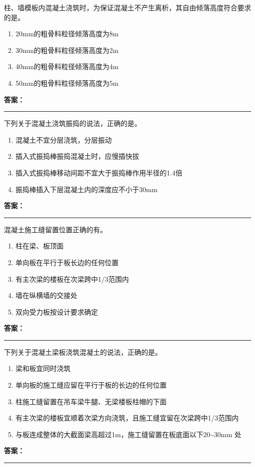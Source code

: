 \documentclass[UTF8,fontset=fandol,11pt]{ctexart}
\newcommand{\answerline}{\textcolor{answerred}{\rule{2.4cm}{0.7pt}}}
\begin{document}
\begin{quizbox}[title={第 73 题}]
柱、墙模板内混凝土浇筑时，为保证混凝土不产生离析，其自由倾落高度符合要求的是。\\
\begin{enumerate}[label=\Alph*.]
\item 20mm的粗骨料粒径倾落高度为8m
\item 30mm的粗骨料粒径倾落高度为2m
\item 40mm的粗骨料粒径倾落高度为4m
\item 50mm的粗骨料粒径倾落高度为5m
\end{enumerate}
\textbf{\textcolor{answerred}{答案：}} \answerline
\end{quizbox}

\begin{quizbox}[title={第 74 题}]
下列关于混凝土浇筑振捣的说法，正确的是。\\
\begin{enumerate}[label=\Alph*.]
\item 混凝土不宜分层浇筑，分层振动
\item 插入式振捣棒振捣混凝土时，应慢插快拔
\item 插入式振捣棒移动间距不宜大于振捣棒作用半径的1.4倍
\item 振捣棒插入下层混凝土内的深度应不小于30mm
\end{enumerate}
\textbf{\textcolor{answerred}{答案：}} \answerline
\end{quizbox}

\begin{quizbox}[title={第 75 题}]
混凝土施工缝留置位置正确的有。\\
\begin{enumerate}[label=\Alph*.]
\item 柱在梁、板顶面
\item 单向板在平行于板长边的任何位置
\item 有主次梁的楼板在次梁跨中1/3范围内
\item 墙在纵横墙的交接处
\item 双向受力板按设计要求确定
\end{enumerate}
\textbf{\textcolor{answerred}{答案：}} \answerline
\end{quizbox}

\begin{quizbox}[title={第 76 题}]
下列关于混凝土梁板浇筑混凝土的说法，正确的是。\\
\begin{enumerate}[label=\Alph*.]
\item 梁和板宜同时浇筑
\item 单向板的施工缝应留在平行于板的长边的任何位置
\item 柱施工缝留置在吊车梁牛腿、无梁楼板柱帽的下面
\item 有主次梁的楼板宜顺着次梁方向浇筑，且施工缝宜留在次梁跨中1/3范围内
\item 与板连成整体的大截面梁高超过1m，施工缝留置在板底面以下20\textasciitilde{}30mm 处
\end{enumerate}
\textbf{\textcolor{answerred}{答案：}} \answerline
\end{quizbox}
\end{document}
